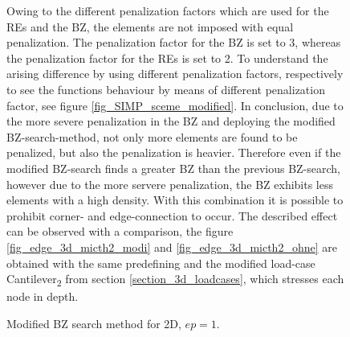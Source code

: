  \begin{figure} [!h]
 \vspace{0.75cm}
\centering
\begin{minipage}{0.5\textwidth}
 \def\svgwidth{\textwidth}
  
 \caption{Modified BZ search method for 2D, $ep = 1$.} %
 \label{fig_edge_2d_search}
\end{minipage}
\hfill
\begin{minipage}{0.45\textwidth}
Owing to the different penalization factors which are used for the REs and the BZ,
 the elements are not imposed with equal penalization. The penalization factor for
 the BZ is set to 3, whereas the penalization factor for the REs is set to 2. To
 understand the arising difference by using different penalization factors,
 respectively to see the functions behaviour by means of different penalization
 factor, see figure \ref{fig_SIMP_sceme_modified}. In 
 conclusion, due to the more severe penalization in the BZ 
 and deploying the modified BZ-search-method, not only 
 more elements are found to be penalized, but also the 
 penalization is heavier. Therefore even if the modified BZ-search
 finds a greater BZ than the previous BZ-search, however
 due to the more servere penalization,
 the BZ exhibits less elements with a high density.
 With this combination it is possible 
 to prohibit corner- and edge-connection to occur. 
 The described effect can be observed with a comparison, 
 the figure \ref{fig_edge_3d_micth2_modi} and
 \ref{fig_edge_3d_micth2_ohne} are obtained 
 with the same predefining and the modified load-case
 Cantilever\textsubscript{2} from
 section \ref{section_3d_loadcases}, which stresses each node in depth.
\end{minipage}
\end{figure}




